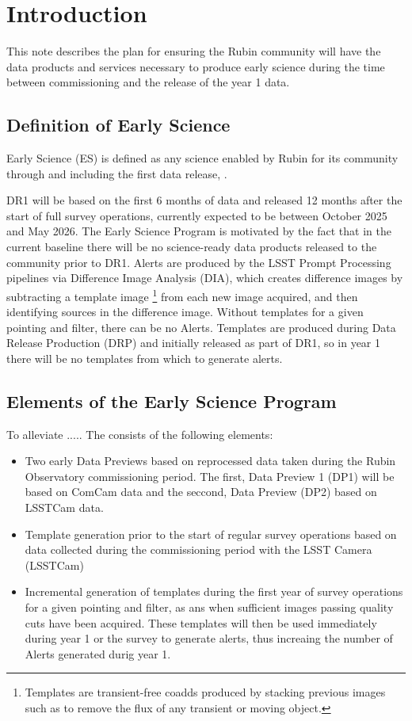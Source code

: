 \section{Introduction}

This  note describes the plan for ensuring the Rubin community will have the data products and services necessary to produce early science during the time between commissioning and the release of the year 1 data.


\subsection{Definition of Early Science}  \label{ssec:defn}

Early Science (ES) is defined as any science enabled by Rubin for its community through and including the first data release, \drone.

DR1 will be based on the first 6 months of data and released 12 months after the start of full survey operations, currently expected to be between October 2025 and May 2026.
The Early Science Program is motivated by the fact that in the current baseline there will be no science-ready data products released to the community prior to DR1. 
Alerts are produced by the LSST Prompt Processing pipelines via Difference Image Analysis (DIA), which creates difference images by subtracting a template image \footnote{Templates are transient-free coadds produced by stacking previous images such as to remove the flux of any transient or moving object.} from each new image acquired, and then identifying sources in the difference image. 
Without templates for a given pointing and filter, there can be no Alerts.
Templates are produced during Data Release Production (DRP) and initially released as part of DR1, so in year 1 there will be no templates from which to generate alerts.


\subsection{Elements of the Early Science Program}

To  alleviate  .....  The \esp consists of the following elements:
\begin{itemize}
	\item Two early Data Previews based on reprocessed data taken during the Rubin Observatory commissioning period. The first, Data Preview 1 (DP1) will be based on ComCam data and the seccond, Data Preview (DP2) based on LSSTCam data. 
	\item Template generation prior to the start of regular survey operations based on data collected during the commissioning period with the LSST Camera (LSSTCam)
	\item Incremental generation of templates during the first year of survey operations for a given pointing and filter, as ans when sufficient images passing quality cuts have been acquired. 
	These templates will then be used immediately during year 1 or the survey to generate alerts, thus increaing the number of Alerts generated durig year 1. 
\end{itemize}


